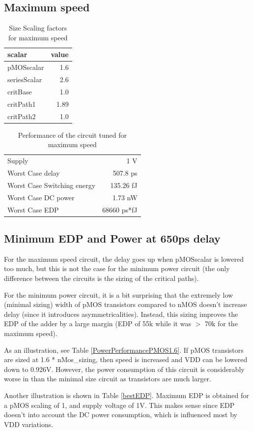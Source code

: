 \documentclass[english]{article}
\begin{document}
\subsection{Maximum speed}
\begin{table}[h]
\centering
\begin{tabular}{ |l|r| }
\hline
scalar	& value \\
\hline
 pMOSscalar		& 1.6 \\
 seriesScalar   & 2.6 \\
 critBase   	& 1.0 \\
 critPath1   	& 1.89 \\
 critPath2    	& 1.0 \\
\hline
\end{tabular}
\caption{Size Scaling factors for maximum speed}
\label{SpeedScalars}
\end{table}

\begin{table}[h]
\centering
\begin{tabular}{ |l|r| }
\hline
Supply						&	1 V \\
Worst Case delay &            507.8 ps  \\
Worst Case Switching energy & 135.26 fJ \\
Worst Case DC power &         1.73   nW  \\
Worst Case EDP &              68660 ps*fJ \\
\hline
\end{tabular}
\caption{Performance of the circuit tuned for maximum speed}
\label{SpeedPerformance}
\end{table}


\subsection{Minimum EDP and Power at 650ps delay}

For the maximum speed circuit, the delay goes up when pMOSscalar is lowered too much, but this is not the case for the minimum power circuit (the only difference between the circuits is the sizing of the critical paths).\par
	For the minimum power circuit, it is a bit surprising that the extremely low (minimal sizing) width of pMOS transistors compared to nMOS doesn't increase delay (since it introduces asymmetricalities). Instead, this sizing improves the EDP of the adder by a large margin (EDP of 55k while it was $>$ 70k for the maximum speed).\par
As an illustration, see Table \ref{PowerPerformancePMOS1.6}. If pMOS transistors are sized at 1.6 * nMos\_sizing, then speed is increased and VDD can be lowered down to 0.926V. However, the power consumption of this circuit is considerably worse in than the minimal size circuit as transistors are much larger. \par
Another illustration is shown in Table \ref{bestEDP}. Maximum EDP is obtained for a pMOS scaling of 1, and supply voltage of 1V. This makes sense since EDP doesn't into account the DC power consumption, which is influenced most by VDD variations.
\end{document}
